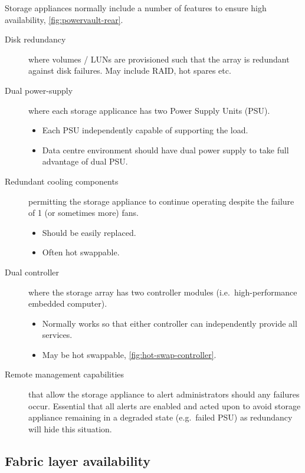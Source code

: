 \documentclass[slides]{pgnotes}
\begin{document}
Storage appliances normally include a number of features to ensure high
availability, \autoref{fig:powervault-rear}.


\begin{description}
\item[Disk redundancy]
where volumes / LUNs are provisioned such that the array is redundant
against disk failures. May include RAID, hot spares etc.
\item[Dual power-supply]
where each storage applicance has two Power Supply Units (PSU).
\begin{itemize}
\item
   Each PSU independently capable of supporting the load.
\item
  Data centre environment should have dual power supply to take full advantage of dual PSU.
\end{itemize}
\item[Redundant cooling components] permitting the storage appliance to continue operating despite the failure of 1 (or sometimes more) fans.
  \begin{itemize}
  \item Should be easily replaced.
  \item Often hot swappable.
  \end{itemize}
\item[Dual controller] where the storage array has two controller modules
  (i.e.~high-performance embedded computer).
  \begin{itemize}
  \item Normally works so that either controller can independently provide all services.
  \item May be hot swappable, \autoref{fig:hot-swap-controller}.
  \end{itemize}
\item[Remote management capabilities]
that allow the storage appliance to alert administrators should any
failures occur. Essential that all alerts are enabled and acted upon to
avoid storage appliance remaining in a degraded state (e.g.~failed PSU)
as redundancy will hide this situation.
\end{description}


\subsection{Fabric layer availability}
\label{sec:fabric-layer-availability}
\end{document}

